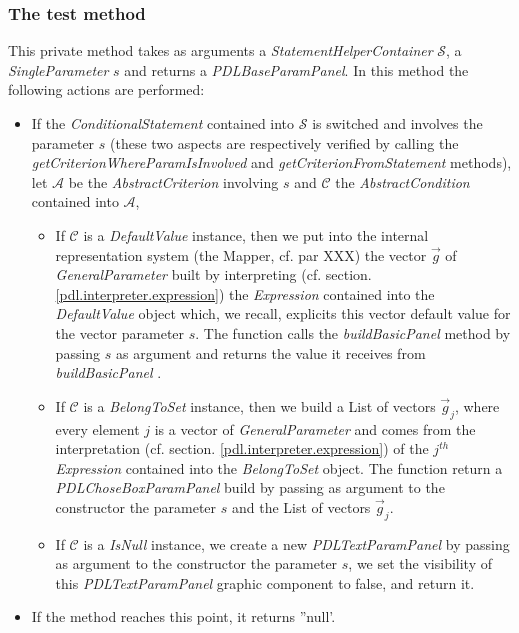 \documentclass[a4paper,11pt] {ivoa}
\begin{document}
\subsubsection{The test method}
This private method takes as arguments a {\it StatementHelperContainer} $\mathcal S$, a {\it SingleParameter} $s$ and returns a  {\it PDLBaseParamPanel}. In this method the following actions are performed:
\begin{itemize}
\item If the {\it ConditionalStatement} contained into $\mathcal S$ is switched and involves the parameter $s$ (these two aspects are respectively verified by calling the {\it getCriterionWhereParamIsInvolved}  and {\it getCriterionFromStatement} methods), let $\mathcal A$ be the {\it AbstractCriterion} involving $s$ and $\mathcal C$ the {\it AbstractCondition} contained into $\mathcal A$,
\begin{itemize}
\item If $\mathcal C$ is a {\it DefaultValue} instance, then we put into the internal representation system (the Mapper, cf. par XXX) the vector $\vec g$ of {\it GeneralParameter} built by interpreting (cf. section. \ref{pdl.interpreter.expression}) the {\it Expression} contained into the {\it DefaultValue} object which, we recall, explicits this vector default value for the vector parameter $s$. The function calls the {\it buildBasicPanel} method by passing $s$ as argument and returns the value it receives from {\it buildBasicPanel} .
\item If $\mathcal C$ is a {\it BelongToSet} instance, then we build a List of vectors $\vec g_j$, where every element $j$ is a vector of {\it GeneralParameter} and comes from the interpretation (cf. section. \ref{pdl.interpreter.expression}) of the  $j^{th}$ {\it Expression} contained into the {\it BelongToSet} object. The function return a {\it PDLChoseBoxParamPanel} build by passing as argument to the constructor the parameter $s$ and the List of vectors $\vec g_j$.
\item If  $\mathcal C$ is a {\it IsNull} instance, we create a new {\it PDLTextParamPanel} by passing as argument to the constructor the parameter $s$, we set the visibility of this  {\it PDLTextParamPanel} graphic component to false, and return it.
\end{itemize}
\item If the method reaches this point, it returns ''null'.
\end{itemize}
\end{document}
